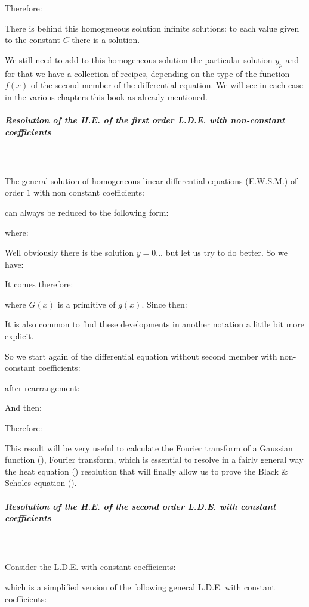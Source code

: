	Therefore:
	
	There is behind this homogeneous solution infinite solutions: to each value given to the constant $C$ there is a solution.
	
	We still need to add to this homogeneous solution the particular solution $y_p$ and for that we have a collection of recipes, depending on the type of the function $f (x)$ of the second member of the differential equation. We will see in each case in the various chapters this book as already mentioned.
	
	\subparagraph{Resolution of the H.E. of the first order L.D.E. with non-constant coefficients}\mbox{}\\\\
	The general solution of homogeneous linear differential equations (E.W.S.M.) of order $1$ with non constant coefficients:
	
	can always be reduced to the following form:
	
	where:
	
	Well obviously there is the solution $y=0$... but let us try to do better. So we have:
	
	It comes therefore:
	
	where $G (x)$ is a primitive of $g (x)$. Since then:
	
	It is also common to find these developments in another notation a little bit more explicit.
	
	So we start again of the differential equation without second member with non-constant coefficients:
	
	after rearrangement:
	
	And then:
	
	Therefore:
	
	This result will be very useful to calculate the Fourier transform of a Gaussian function (), Fourier transform, which is essential to resolve in a fairly general way the heat equation () resolution that will finally allow us to prove the Black \& Scholes equation ().
	
	\subparagraph{Resolution of the H.E. of the second order L.D.E. with constant coefficients}\mbox{}\\\\
	Consider the L.D.E. with constant coefficients:
	
	which is a simplified version of the following general L.D.E. with constant coefficients:
	
